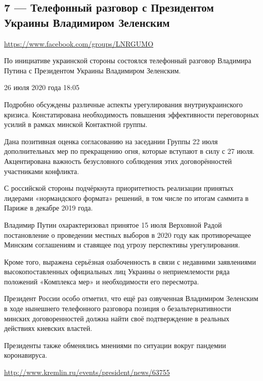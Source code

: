  
 
  
\clearpage
\subsection{7 --- Телефонный разговор с Президентом Украины Владимиром Зеленским}
\url{https://www.facebook.com/groups/LNRGUMO}

По инициативе украинской стороны состоялся телефонный разговор Владимира Путина с Президентом Украины Владимиром Зеленским.

26 июля 2020 года
18:05

Подробно обсуждены различные аспекты урегулирования внутриукраинского кризиса.
Констатирована необходимость повышения эффективности переговорных усилий в
рамках минской Контактной группы.

Дана позитивная оценка согласованию на заседании Группы 22 июля дополнительных
мер по прекращению огня, которые вступают в силу с 27 июля.  Акцентирована
важность безусловного соблюдения этих договорённостей участниками конфликта.

С российской стороны подчёркнута приоритетность реализации принятых лидерами
«нормандского формата» решений, в том числе по итогам саммита в Париже в
декабре 2019 года.

Владимир Путин охарактеризовал принятое 15 июля Верховной Радой постановление о
проведении местных выборов в 2020 году как противоречащее Минским соглашениям и
ставящее под угрозу перспективы урегулирования.

Кроме того, выражена серьёзная озабоченность в связи с недавними заявлениями
высокопоставленных официальных лиц Украины о неприемлемости ряда положений
«Комплекса мер» и необходимости его пересмотра.

Президент России особо отметил, что ещё раз озвученная Владимиром Зеленским в
ходе нынешнего телефонного разговора позиция о безальтернативности минских
договоренностей должна найти своё подтверждение в реальных действиях киевских
властей.

Президенты также обменялись мнениями по ситуации вокруг пандемии коронавируса.

\url{http://www.kremlin.ru/events/president/news/63755}
